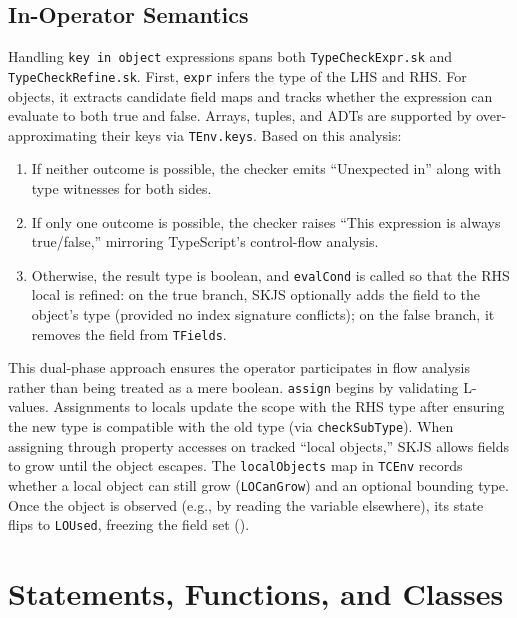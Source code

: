 \documentclass[11pt]{article}
\newcommand{\code}[1]{\path{#1}}
\begin{document}
\subsection{In-Operator Semantics}
Handling \texttt{key in object} expressions spans both \texttt{TypeCheckExpr.sk} and \texttt{TypeCheckRefine.sk}. First, \texttt{expr} infers the type of the LHS and RHS. For objects, it extracts candidate field maps and tracks whether the expression can evaluate to both true and false. Arrays, tuples, and ADTs are supported by over-approximating their keys via \texttt{TEnv.keys}. Based on this analysis:
\begin{enumerate}[leftmargin=*]
  \item If neither outcome is possible, the checker emits ``Unexpected in'' along with type witnesses for both sides.
  \item If only one outcome is possible, the checker raises ``This expression is always true/false,'' mirroring TypeScript's control-flow analysis.
  \item Otherwise, the result type is boolean, and \texttt{evalCond} is called so that the RHS local is refined: on the true branch, SKJS optionally adds the field to the object's type (provided no index signature conflicts); on the false branch, it removes the field from \texttt{TFields}.
\end{enumerate}
This dual-phase approach ensures the operator participates in flow analysis rather than being treated as a mere boolean.
\texttt{assign} begins by validating L-values. Assignments to locals update the scope with the RHS type after ensuring the new type is compatible with the old type (via \texttt{checkSubType}). When assigning through property accesses on tracked ``local objects,'' SKJS allows fields to grow until the object escapes. The \texttt{localObjects} map in \texttt{TCEnv} records whether a local object can still grow (\texttt{LOCanGrow}) and an optional bounding type. Once the object is observed (e.g., by reading the variable elsewhere), its state flips to \texttt{LOUsed}, freezing the field set (\code{src/TypeCheckExpr.sk}).

\section{Statements, Functions, and Classes}
\end{document}
